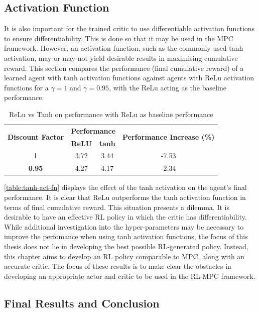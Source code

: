 \subsection{Activation Function}\label{ssection:act-fn}
It is also important for the trained critic to use differentiable activation functions to ensure differentiability. This is done so that it may be used in the MPC framework. However, an activation function, such as the commonly used tanh activation, may or may not yield desirable results in maximising cumulative reward. This section compares the performance (final cumulative reward) of a learned agent with tanh activation functions against agents with ReLu activation functions for a $\gamma = 1$ and $\gamma = 0.95$, with the ReLu acting as the baseline performance.


	
\begin{table}[h!]
	\centering
	\begin{tabular}{c c c c}
		\toprule
		\multirow{2}{*}{\textbf{Discount Factor}} & \multicolumn{2}{c}{\textbf{Performance}} & \multirow{2}{*}{\textbf{Performance Increase (\%)}} \\
		\cmidrule{2-3}
		& \textbf{ReLU} & \textbf{tanh} &  \\
		\midrule
		\textbf{1}   & 3.72 & 3.44 & -7.53 \\
		\textbf{0.95} & 4.27 & 4.17 & -2.34 \\
		\bottomrule
	\end{tabular}
	\caption{ReLu vs Tanh on performance with ReLu as baseline performance}
	\label{table:tanh-act-fn}
\end{table}
	
\autoref{table:tanh-act-fn} displays the effect of the tanh activation on the agent’s final performance. It is clear that ReLu outperforms the tanh activation function in terms of final cumulative reward. This situation presents a dilemma. It is desirable to have an effective RL policy in which the critic has differentiability. While additional investigation into the hyper-parameters may be necessary to improve the perfomance when using tanh activation functions, the focus of this thesis does not lie in developing the best possible RL-generated policy. Instead, this chapter aims to develop an RL policy comparable to MPC, along with an accurate critic. The focus of these results is to make clear the obstacles in developing an appropriate actor and critic to be used in the RL-MPC framework.

\subsection{Final Results and Conclusion}
\label{section:rl-deterministic-results}


